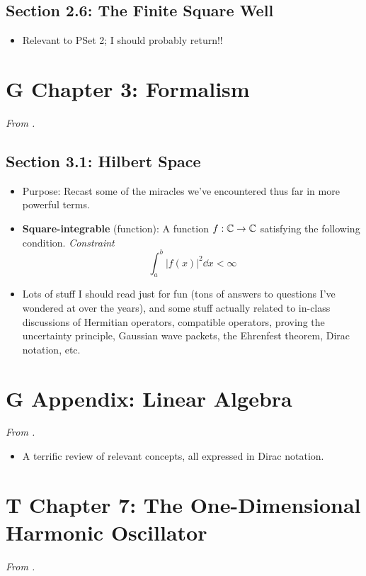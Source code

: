 \documentclass[../notes.tex]{subfiles}
\begin{document}
\subsection*{Section 2.6: The Finite Square Well}
\begin{itemize}
    \item Relevant to PSet 2; I should probably return!!
\end{itemize}



\section{G Chapter 3: Formalism}
\emph{From \textcite{bib:Griffiths}.}
\subsection*{Section 3.1: Hilbert Space}
\begin{itemize}
    \item Purpose: Recast some of the miracles we've encountered thus far in more powerful terms.
    \item {}\textbf{Square-integrable} (function): A function $f:\mathbb{C}\to\mathbb{C}$ satisfying the following condition. \emph{Constraint}
    \begin{equation*}
        \int_a^b|f(x)|^2\dd{x} < \infty
    \end{equation*}
    \item {}Lots of stuff I should read just for fun (tons of answers to questions I've wondered at over the years), and some stuff actually related to in-class discussions of Hermitian operators, compatible operators, proving the uncertainty principle, Gaussian wave packets, the Ehrenfest theorem, Dirac notation, etc.
\end{itemize}



\section{G Appendix: Linear Algebra}
\emph{From \textcite{bib:Griffiths}.}
\begin{itemize}
    \item A terrific review of relevant concepts, all expressed in Dirac notation.
\end{itemize}



\section{T Chapter 7: The One-Dimensional Harmonic Oscillator}
\emph{From \textcite{bib:Townsend}.}
\end{document}
